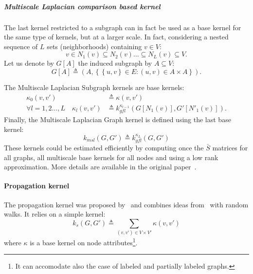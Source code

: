                 \subparagraph{Multiscale Laplacian comparison based kernel}
                    The last kernel restricted to a subgraph can in fact be used as a base kernel for the same type of kernels, but at a larger scale.
                    In fact, considering a nested sequence of $L$ sets (neighborhoods) containing $v \in V$:
                    \begin{equation}
                        \label{eq::centered_nested_subgraphs}
                        v \in N_1(v) \subseteq N_2(v) \dots \subseteq N_L(v) \subseteq V.
                    \end{equation}
                    Let us denote by $G[A]$ the induced subgraph by $A \subseteq V$:
                    \begin{equation}
                        \label{eq::induced_subgraph}
                        G[A] \triangleq (A, \left\{\left\{u, v\right\} \in E: (u, v) \in A \times A \right\}).
                    \end{equation}

                    The Multiscale Laplacian Subgraph kernels are base kernels:
                    \begin{align}
                        \kappa_0(v, v') &\triangleq \kappa(v, v')\\
                        \forall l = 1, 2\dots,L \quad \kappa_l(v, v') &\triangleq k^{\kappa_{l-1}}_{gfl}\left(G[N_1(v)], G'[N'_1(v)]\right).
                    \end{align}
                    Finally, the Multiscale Laplacian Graph kernel is defined using the last base kernel:
                    \begin{equation}
                        \label{eq::multiscale_laplacian_kernel}
                        k_{msl}(G, G') \triangleq k^{\kappa_L}_{gfl}(G, G')
                    \end{equation}
                    These kernels could be estimated efficiently by computing once the $\bar{S}$ matrices for all graphs, all multiscale base kernels for all nodes and using a low rank approximation.
                    More details are available in the original paper~\parencite{kondor2016multiscale}.

            \paragraph{Propagation kernel}
                The propagation kernel was proposed by~\parencite{neumann2016propagation} and combines ideas from~\parencite{shervashidze2011weisfeiler} with random walks.
                It relies on a simple kernel:
                \begin{equation}
                    \label{eq::simple_kernel}
                    k_s(G, G') \triangleq \sum_{(v, v') \in V\times V'} \kappa(v, v')
                \end{equation}
                where $\kappa$ is a base kernel on node attributes\footnote{It can accomodate also the case of labeled and partially labeled graphs.}.\\

